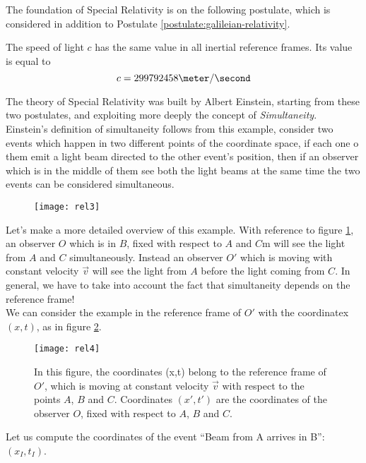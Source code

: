 The foundation of Special Relativity is on the following postulate, which is considered in addition to Postulate \ref{postulate:galileian-relativity}.

\begin{postulate}[Invariance of $c$]
\label{postulate:invariance-of-c}
The speed of light $c$ has the same value in all inertial reference frames. Its value is equal to
\[c = 299792458 \meter/\second\]
\end{postulate}

The theory of Special Relativity was built by Albert Einstein, starting from these two postulates, and exploiting more deeply the concept of \emph{Simultaneity}.
Einstein's definition of simultaneity follows from this example, consider two events which happen in two different points of the coordinate space, if each one o them emit a light beam directed to the other event's position, then if an observer which is in the middle of them see both the light beams at the same time the two events can be considered simultaneous.\\

\begin{figure}
    \centering
    \texttt{[image: rel3]}
    \label{fig:rel3}
\end{figure}{}

Let's make a more detailed overview of this example. With reference to figure \ref{fig:rel3}, an observer $O$ which is in $B$, fixed with respect to $A$ and $C$m  will see the light from $A$ and $C$ simultaneously. Instead an observer $O'$ which is moving with constant velocity $\vec{v}$ will see the light from $A$ before the light coming from $C$. In general, we have to take into account the fact that simultaneity depends on the reference frame!\\

We can consider the example in the reference frame of $O'$ with the coordinatex $(x,t)$, as in figure \ref{fig:rel4}. 

\begin{figure}
    \centering
    \texttt{[image: rel4]}
    \label{fig:rel4}
    \caption{In this figure, the coordinates (x,t) belong to the reference frame of $O'$, which is moving at constant velocity $\vec{v}$ with respect to the points $A$, $B$ and $C$. Coordinates $(x',t')$ are the coordinates of the observer $O$, fixed with respect to $A$, $B$ and $C$.}
\end{figure}{}


Let us compute the coordinates of the event ``Beam from A arrives in B'': $(x_I,t_I)$.

